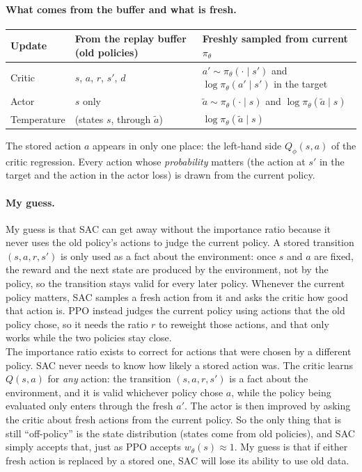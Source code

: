 \documentclass[11pt]{article}
\begin{document}
\paragraph{What comes from the buffer and what is fresh.}
\begin{center}
\begin{tabular}{lll}
  \toprule
  Update & From the replay buffer (old policies) & Freshly sampled from current $\pi_\theta$ \\
  \midrule
  Critic & $s$, $a$, $r$, $s'$, $d$ & $a'\sim\pi_\theta(\cdot\mid s')$ and $\log\pi_\theta(a'\mid s')$ in the target \\
  Actor  & $s$ only & $\tilde a\sim\pi_\theta(\cdot\mid s)$ and $\log\pi_\theta(\tilde a\mid s)$ \\
  Temperature & (states $s$, through $\tilde a$) & $\log\pi_\theta(\tilde a\mid s)$ \\
  \bottomrule
\end{tabular}
\end{center}
The stored action $a$ appears in only one place: the left-hand side $Q_\phi(s,a)$ of the critic
regression. Every action whose \emph{probability} matters (the action at $s'$ in the target and the
action in the actor loss) is drawn from the current policy.

\paragraph{My guess.}
 My guess is that SAC can get away without the importance ratio because it never uses the old
 policy's actions to judge the current policy. A stored transition $(s,a,r,s')$ is only used as a fact
 about the environment: once $s$ and $a$ are fixed, the reward and the next state are produced by the
 environment, not by the policy, so the transition stays valid for every later policy. Whenever the
 current policy matters, SAC samples a fresh action from it and asks the critic how good that action
 is. PPO instead judges the current policy using actions that the old policy chose, so it needs the
 ratio $r$ to reweight those actions, and that only works while the two policies stay close.\\

\noindent The importance ratio exists to correct for actions that were chosen by a different policy. SAC never
needs to know how likely a stored action was. The critic learns $Q(s,a)$ for \emph{any} action:
the transition $(s,a,r,s')$ is a fact about the environment, and it is valid whichever policy chose $a$,
while the policy being evaluated only enters through the fresh $a'$. The actor is then improved
by asking the critic about fresh actions from the current policy. So the only thing that is still
``off-policy'' is the state distribution (states come from old policies), and SAC simply accepts that,
just as PPO accepts $w_\theta(s)\approx1$. My guess is that if either fresh action is replaced by a stored one, SAC
will lose its ability to use old data.
\end{document}
